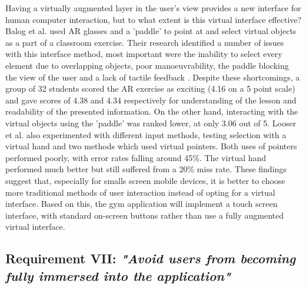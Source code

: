 \documentclass{l4proj}
\begin{document}
Having a virtually augmented layer in the user's view provides a new interface for human computer interaction, but to what extent is this virtual interface effective? Balog et al. used AR glasses and a 'paddle' to point at and select virtual objects as a part of a classroom exercise. Their research identified a number of issues with this interface method, most important were the inability to select every element due to overlapping objects, poor manoeuvrability, the paddle blocking the view of the user and a lack of tactile feedback \cite{balog_augmented_2007}. Despite these shortcomings, a group of 32 students scored the AR exercise as exciting (4.16 on a 5 point scale) and gave scores of 4.38 and 4.34 respectively for understanding of the lesson and readability of the presented information\cite{looser_evaluation_2007}. On the other hand, interacting with the virtual objects using the 'paddle' was ranked lower, at only 3.06 out of 5\cite{balog_augmented_2007}. Looser et al. also experimented with different input methods, testing selection with a virtual hand and two methods which used virtual pointers\cite{looser_evaluation_2007}. Both uses of pointers performed poorly, with error rates falling around 45\%\cite{looser_evaluation_2007}. The virtual hand performed much better but still suffered from a 20\% miss rate\cite{looser_evaluation_2007}. These findings suggest that, especially for smalls screen mobile devices, it is better to choose more traditional methods of user interaction instead of opting for a virtual interface. Based on this, the gym application will implement a touch screen interface, with standard on-screen buttons rather than use a fully augmented virtual interface. 

\subsection{\textbf{Requirement VII:} \textit{"Avoid users from becoming fully immersed into the application"}}
\label{requirement_VI}
\end{document}
